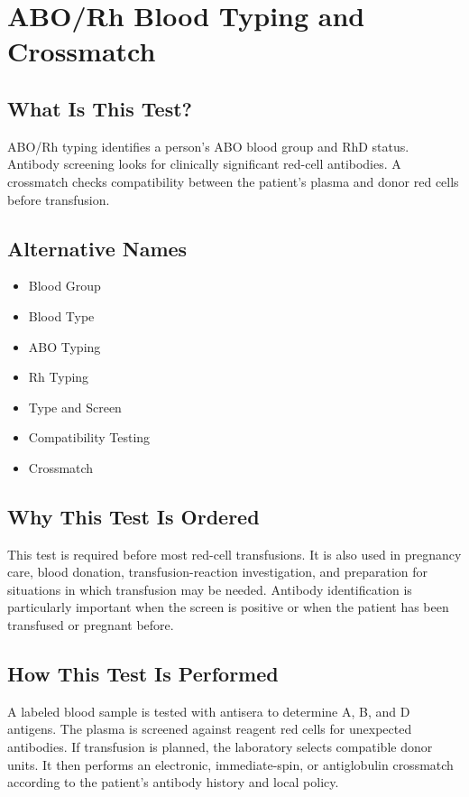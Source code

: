 \chapter{ABO/Rh Blood Typing and Crossmatch}

\section*{What Is This Test?}
ABO/Rh typing identifies a person's ABO blood group and RhD status. Antibody screening looks for clinically significant red-cell antibodies. A crossmatch checks compatibility between the patient's plasma and donor red cells before transfusion.

\section*{Alternative Names}
\begin{itemize}
  \item Blood Group
  \item Blood Type
  \item ABO Typing
  \item Rh Typing
  \item Type and Screen
  \item Compatibility Testing
  \item Crossmatch
\end{itemize}
\section*{Why This Test Is Ordered}
This test is required before most red-cell transfusions. It is also used in pregnancy care, blood donation, transfusion-reaction investigation, and preparation for situations in which transfusion may be needed. Antibody identification is particularly important when the screen is positive or when the patient has been transfused or pregnant before.

\section*{How This Test Is Performed}
A labeled blood sample is tested with antisera to determine A, B, and D antigens. The plasma is screened against reagent red cells for unexpected antibodies. If transfusion is planned, the laboratory selects compatible donor units. It then performs an electronic, immediate-spin, or antiglobulin crossmatch according to the patient's antibody history and local policy.

